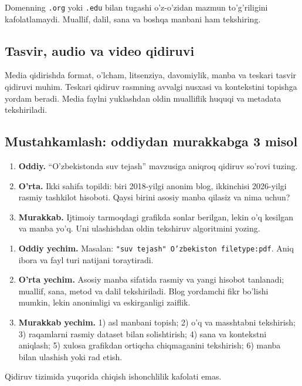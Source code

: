 \documentclass[11pt,a4paper,oneside]{book}
\begin{document}
\begin{attest}
Domenning \texttt{.org} yoki \texttt{.edu} bilan tugashi o'z-o'zidan mazmun to'g'riligini kafolatlamaydi. Muallif, dalil, sana va boshqa manbani ham tekshiring.
\end{attest}

\subsection{Tasvir, audio va video qidiruvi}
Media qidirishda format, o'lcham, litsenziya, davomiylik, manba va teskari tasvir qidiruvi muhim. Teskari qidiruv rasmning avvalgi nusxasi va kontekstini topishga yordam beradi. Media faylni yuklashdan oldin mualliflik huquqi va metadata tekshiriladi.

\subsection{Mustahkamlash: oddiydan murakkabga 3 misol}
\begin{taskbox}
\begin{enumerate}[leftmargin=7mm]
\item \textbf{Oddiy.} ``O'zbekistonda suv tejash'' mavzusiga aniqroq qidiruv so'rovi tuzing.
\item \textbf{O'rta.} Ikki sahifa topildi: biri 2018-yilgi anonim blog, ikkinchisi 2026-yilgi rasmiy tashkilot hisoboti. Qaysi birini asosiy manba qilasiz va nima uchun?
\item \textbf{Murakkab.} Ijtimoiy tarmoqdagi grafikda sonlar berilgan, lekin o'q kesilgan va manba yo'q. Uni ulashishdan oldin tekshiruv algoritmini yozing.
\end{enumerate}
\end{taskbox}

\begin{solutionbox}
\begin{enumerate}[leftmargin=7mm]
\item \textbf{Oddiy yechim.} Masalan: \texttt{"suv tejash" O'zbekiston filetype:pdf}. Aniq ibora va fayl turi natijani toraytiradi.
\item \textbf{O'rta yechim.} Asosiy manba sifatida rasmiy va yangi hisobot tanlanadi; muallif, sana, metod va dalil tekshiriladi. Blog yordamchi fikr bo'lishi mumkin, lekin anonimligi va eskirganligi zaiflik.
\item \textbf{Murakkab yechim.} 1) asl manbani topish; 2) o'q va masshtabni tekshirish; 3) raqamlarni rasmiy dataset bilan solishtirish; 4) sana va kontekstni aniqlash; 5) xulosa grafikdan ortiqcha chiqmaganini tekshirish; 6) manba bilan ulashish yoki rad etish.
\end{enumerate}
\end{solutionbox}
\begin{attest}Qidiruv tizimida yuqorida chiqish ishonchlilik kafolati emas.\end{attest}
\end{document}
